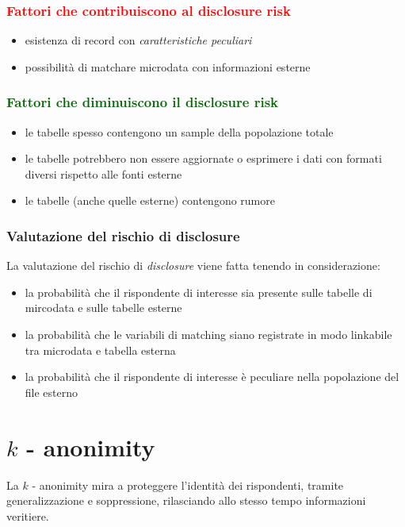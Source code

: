 \documentclass{report}
\begin{document}
\subsubsection{\textcolor{red}{Fattori che contribuiscono al disclosure risk}}
\begin{itemize}
    \item esistenza di record con \textit{caratteristiche peculiari}
    \item possibilità di matchare microdata con informazioni esterne 
\end{itemize}

\subsubsection{\textcolor{darkgreen}{Fattori che diminuiscono il disclosure risk}}
\begin{itemize}
    \item le tabelle spesso contengono un sample della popolazione totale
    \item le tabelle potrebbero non essere aggiornate o esprimere i dati con formati diversi rispetto alle fonti esterne 
    \item le tabelle (anche quelle esterne) contengono rumore
\end{itemize}

\subsubsection{Valutazione del rischio di disclosure}
La valutazione del rischio di \textit{disclosure} viene fatta tenendo in considerazione:
\begin{itemize}
    \item la probabilità che il rispondente di interesse sia presente sulle tabelle di mircodata e sulle tabelle esterne 
    \item la probabilità che le variabili di matching siano registrate in modo linkabile tra microdata e tabella esterna 
    \item la probabilità che il rispondente di interesse è peculiare nella popolazione del file esterno 
\end{itemize}

\newpage
\section{$k$ - anonimity}

La $k$ - anonimity mira a proteggere l'identità dei rispondenti, tramite generalizzazione e soppressione, 
rilasciando allo stesso tempo informazioni veritiere.
\end{document}
